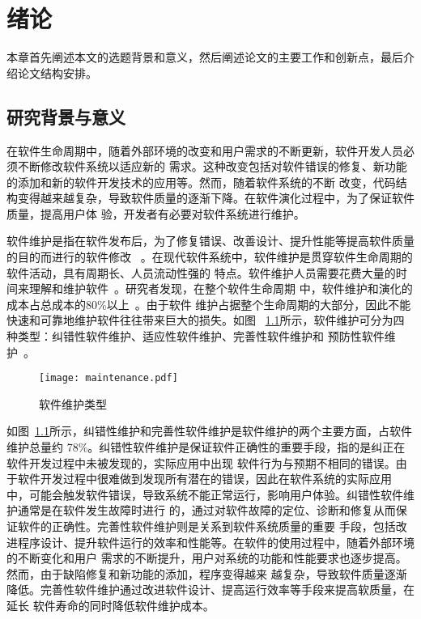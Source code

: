 
\chapter{绪论}
\label{chpt:introduction}
本章首先阐述本文的选题背景和意义，然后阐述论文的主要工作和创新点，最后介绍论文结构安排。

\section{研究背景与意义}
在软件生命周期中，随着外部环境的改变和用户需求的不断更新，软件开发人员必须不断修改软件系统以适应新的
需求。这种改变包括对软件错误的修复、新功能的添加和新的软件开发技术的应用等。然而，随着软件系统的不断
改变，代码结构变得越来越复杂，导致软件质量的逐渐下降。在软件演化过程中，为了保证软件质量，提高用户体
验，开发者有必要对软件系统进行维护。

软件维护是指在软件发布后，为了修复错误、改善设计、提升性能等提高软件质量的目的而进行的软件修改
~\cite{IEEE1219}。在现代软件系统中，软件维护是贯穿软件生命周期的软件活动，具有周期长、人员流动性强的
特点。软件维护人员需要花费大量的时间来理解和维护软件~\cite{Bansiya2002}。研究者发现，在整个软件生命周期
中，软件维护和演化的成本占总成本的80\%以上~\cite{guimaraes1983managing, coleman1994using}。由于软件
维护占据整个生命周期的大部分，因此不能快速和可靠地维护软件往往带来巨大的损失。如图
~\ref{fig:maintenance}所示，软件维护可分为四种类型：纠错性软件维护、适应性软件维护、完善性软件维护和
预防性软件维护~\cite{lientz1978characteristics}。

\begin{figure}
  \centering
  \texttt{[image: maintenance.pdf]}  
  \caption{\label{fig:maintenance}软件维护类型}
\end{figure}

如图~\ref{fig:maintenance}所示，纠错性维护和完善性软件维护是软件维护的两个主要方面，占软件维护总量约
78\%。纠错性软件维护是保证软件正确性的重要手段，指的是纠正在软件开发过程中未被发现的，实际应用中出现
软件行为与预期不相同的错误。由于软件开发过程中很难做到发现所有潜在的错误，因此在软件系统的实际应用
中，可能会触发软件错误，导致系统不能正常运行，影响用户体验。纠错性软件维护通常是在软件发生故障时进行
的，通过对软件故障的定位、诊断和修复从而保证软件的正确性。完善性软件维护则是关系到软件系统质量的重要
手段，包括改进程序设计、提升软件运行的效率和性能等。在软件的使用过程中，随着外部环境的不断变化和用户
需求的不断提升，用户对系统的功能和性能要求也逐步提高。然而，由于缺陷修复和新功能的添加，程序变得越来
越复杂，导致软件质量逐渐降低。完善性软件维护通过改进软件设计、提高运行效率等手段来提高软质量，在延长
软件寿命的同时降低软件维护成本。

